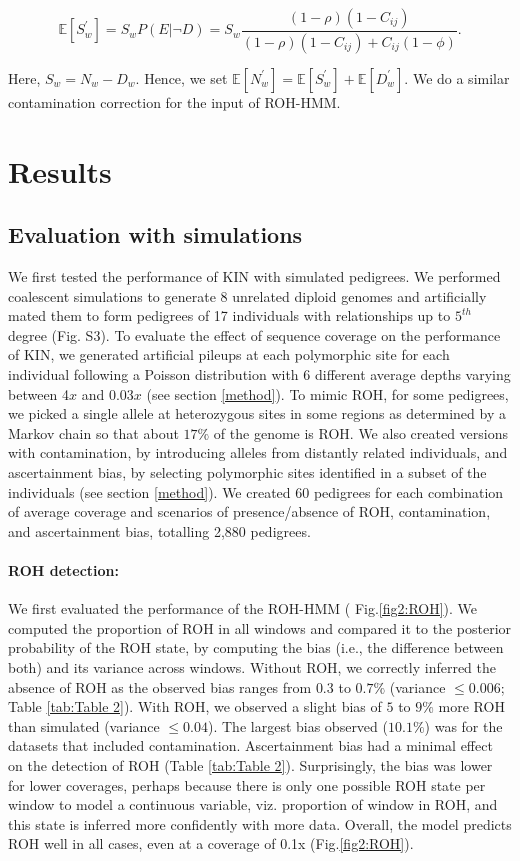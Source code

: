 \documentclass[12pt, letterpaper]{article}
\begin{document}
 \begin{equation}
\mathbb{E}[S_w^{'}] = S_{w} P(E| \neg D) = S_{w} \frac{(1-\rho)(1-C_{ij})}{(1-\rho)(1-C_{ij}) + C_{ij}(1-\phi)}.
 \end{equation}

Here, $S_w = N_w - D_w$. Hence, we set $\mathbb{E}[N_w^{'}] = \mathbb{E}[S_w^{'}] + \mathbb{E}[D_w^{'}]$. We do a similar contamination correction for the input of ROH-HMM.




\section{Results}\label{results}

\subsection{Evaluation with simulations}
We first tested the performance of KIN with simulated pedigrees. We performed coalescent simulations to generate 8 unrelated diploid genomes and artificially mated them to form pedigrees of 17 individuals with relationships up to $5^{th}$ degree (Fig. S3). To evaluate the effect of sequence coverage on the performance of KIN, we generated artificial pileups at each polymorphic site for each individual following a Poisson distribution with 6 different average depths varying between 4$x$ and 0.03$x$ (see section \ref{method}). To mimic ROH, for some pedigrees, we picked a single allele at heterozygous sites in some regions as determined by a Markov chain so that about $17\%$ of the genome is ROH. We also created versions with contamination, by introducing alleles from distantly related individuals, and ascertainment bias, by selecting polymorphic sites identified in a subset of the individuals (see section \ref{method}). We created 60 pedigrees for each combination of average coverage and scenarios of presence/absence of ROH, contamination, and ascertainment bias, totalling 2,880 pedigrees.

\paragraph{ROH detection:}
We first evaluated the performance of the ROH-HMM ( Fig.\ref{fig2:ROH}). We computed the proportion of ROH in all windows and compared it to the posterior probability of the ROH state, by computing the bias (i.e., the difference between both) and its variance across windows. Without ROH, we correctly inferred the absence of ROH as the observed bias ranges from $0.3$ to $0.7\%$ (variance $\leq0.006$; Table \ref{tab:Table 2}). With ROH, we observed a slight bias of $5$ to $9\%$ more ROH than simulated (variance $\leq0.04$). The largest bias observed ($10.1\%$) was for the datasets that included contamination. Ascertainment bias had a minimal effect on the detection of ROH (Table \ref{tab:Table 2}). Surprisingly, the bias was lower for lower coverages, perhaps because there is only one possible ROH state per window to model a continuous variable, viz. proportion of window in ROH, and this state is inferred more confidently with more data. Overall, the model predicts ROH well in all cases, even at a coverage of 0.1x (Fig.\ref{fig2:ROH}).
\end{document}
